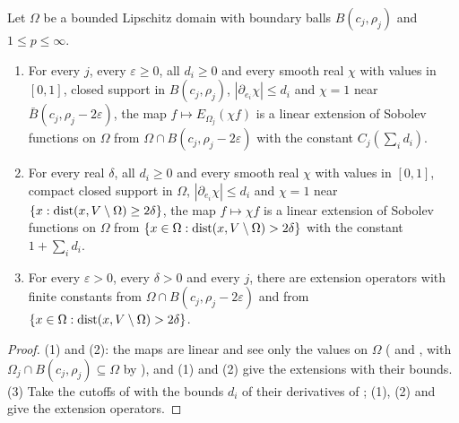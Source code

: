 \begin{lemma}
\label{lem:reflection-patches-linear}
\leanok
{}
Let $\Omega$ be a bounded Lipschitz domain with boundary balls $B(c_j, \rho_j)$ and
$1 \leq p \leq \infty$.
\begin{enumerate}
  \item For every $j$, every $\varepsilon \geq 0$, all $d_i \geq 0$ and every smooth real $\chi$
    with values in $[0, 1]$, closed support in $B(c_j, \rho_j)$, $|\partial_{e_i} \chi| \leq d_i$
    and $\chi = 1$ near $\bar B(c_j, \rho_j - 2 \varepsilon)$, the map
    $f \mapsto E_{\Omega_j}(\chi f)$ is a linear extension of Sobolev functions on $\Omega$ from
    $\Omega \cap B(c_j, \rho_j - 2 \varepsilon)$ with the constant $C_j(\sum_i d_i)$.
  \item For every real $\delta$, all $d_i \geq 0$ and every smooth real $\chi$ with values in
    $[0, 1]$, compact closed support in $\Omega$, $|\partial_{e_i} \chi| \leq d_i$ and $\chi = 1$
    near $\{x : \operatorname{dist}(x, V \setminus \Omega) \geq 2 \delta\}$, the map $f \mapsto \chi f$ is a
    linear extension of Sobolev functions on $\Omega$ from
    $\{x \in \Omega : \operatorname{dist}(x, V \setminus \Omega) > 2 \delta\}$ with the constant
    $1 + \sum_i d_i$.
  \item For every $\varepsilon > 0$, every $\delta > 0$ and every $j$, there are extension operators
    with finite constants from $\Omega \cap B(c_j, \rho_j - 2 \varepsilon)$ and from
    $\{x \in \Omega : \operatorname{dist}(x, V \setminus \Omega) > 2 \delta\}$.
\end{enumerate}
\end{lemma}

\begin{proof}
\leanok
(1) and (2): the maps are linear and see only the values on $\Omega$
( and , with
$\Omega_j \cap B(c_j, \rho_j) \subseteq \Omega$ by ), and
 (1) and (2) give the extensions with their bounds. (3) Take the
cutoffs of  with the bounds $d_i$ of their derivatives of
; (1), (2) and  give the
extension operators.
\end{proof}

